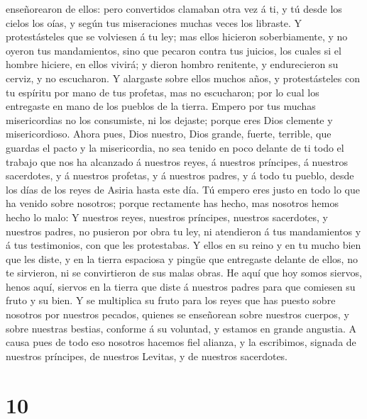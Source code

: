 enseñorearon de ellos: pero convertidos clamaban otra vez á ti, y tú
desde los cielos los oías, y según tus miseraciones muchas veces los
libraste.  Y protestásteles que se volviesen á tu ley;
mas ellos hicieron soberbiamente, y no oyeron tus mandamientos, sino que
pecaron contra tus juicios, los cuales si el hombre hiciere, en ellos
vivirá; y dieron hombro renitente, y endurecieron su cerviz, y no
escucharon.  Y alargaste sobre ellos muchos años, y
protestásteles con tu espíritu por mano de tus profetas, mas no
escucharon; por lo cual los entregaste en mano de los pueblos de la
tierra.  Empero por tus muchas misericordias no los
consumiste, ni los dejaste; porque eres Dios clemente y misericordioso.
 Ahora pues, Dios nuestro, Dios grande, fuerte, terrible,
que guardas el pacto y la misericordia, no sea tenido en poco delante de
ti todo el trabajo que nos ha alcanzado á nuestros reyes, á nuestros
príncipes, á nuestros sacerdotes, y á nuestros profetas, y á nuestros
padres, y á todo tu pueblo, desde los días de los reyes de Asiria hasta
este día.  Tú empero eres justo en todo lo que ha venido
sobre nosotros; porque rectamente has hecho, mas nosotros hemos hecho lo
malo:  Y nuestros reyes, nuestros príncipes, nuestros
sacerdotes, y nuestros padres, no pusieron por obra tu ley, ni
atendieron á tus mandamientos y á tus testimonios, con que les
protestabas.  Y ellos en su reino y en tu mucho bien que
les diste, y en la tierra espaciosa y pingüe que entregaste delante de
ellos, no te sirvieron, ni se convirtieron de sus malas obras.
 He aquí que hoy somos siervos, henos aquí, siervos en la
tierra que diste á nuestros padres para que comiesen su fruto y su bien.
 Y se multiplica su fruto para los reyes que has puesto
sobre nosotros por nuestros pecados, quienes se enseñorean sobre
nuestros cuerpos, y sobre nuestras bestias, conforme á su voluntad, y
estamos en grande angustia.  A causa pues de todo eso
nosotros hacemos fiel alianza, y la escribimos, signada de nuestros
príncipes, de nuestros Levitas, y de nuestros sacerdotes.

\hypertarget{section-9}{%
\section{10}\label{section-9}}


